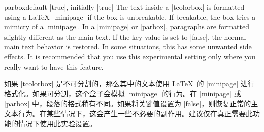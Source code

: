 \begin{docTcbKey}[][doc updated=2015-10-14]{parbox}{}{default |true|, initially |true|}
The text inside a |tcolorbox| is formatted using a \LaTeX\ |minipage|
if the box is unbreakable. 
If breakable, the box tries a mimicry of a |minipage|. 
In a |minipage| or |parbox|, paragraphs are formatted slightly different
as the main text. If the key value is set to |false|, the normal main text
behavior is restored. In some situations, this has some unwanted side
effects. It is recommended that you use this experimental setting only
where you really want to have this feature.

如果 |tcolorbox| 是不可分割的，那么其中的文本使用 \LaTeX\ 的 |minipage| 进行格式化。如果可分割，这个盒子会模拟 |minipage| 的行为。在 |minipage| 或 |parbox| 中，段落的格式稍有不同。如果将关键值设置为 |false|，则恢复正常的主文本行为。在某些情况下，这会产生一些不必要的副作用。建议仅在真正需要此功能的情况下使用此实验设置。

\end{docTcbKey}

\begin{dispListing}

\begin{tcolorbox}[parbox,adjusted title={parbox=true (normal)}]
\lipsum[1-2]
\end{tcolorbox}\hfill%
\begin{tcolorbox}[parbox=false,adjusted title={parbox=false}]
\lipsum[1-2]
\end{tcolorbox}%
\end{dispListing}
{\tcbusetemp}




